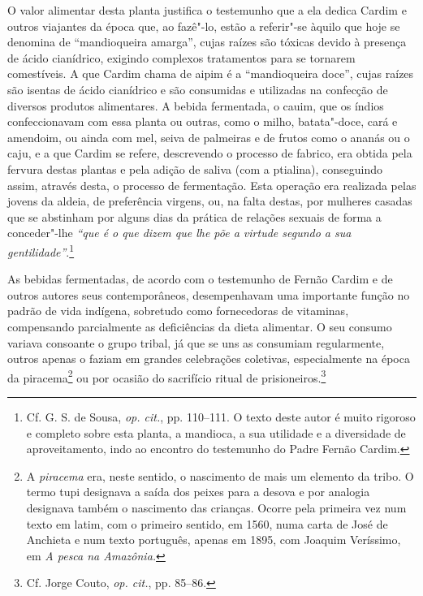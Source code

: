  O valor alimentar desta planta justifica o testemunho que a
ela dedica Cardim e outros viajantes da época que, ao fazê"-lo, estão a
referir"-se àquilo que hoje se denomina de ``mandioqueira amarga'', cujas
raízes são tóxicas devido à presença de ácido cianídrico, exigindo
complexos tratamentos para se tornarem comestíveis. A que Cardim chama
de aipim é a ``mandioqueira doce'', cujas raízes são isentas de
ácido cianídrico e são consumidas e utilizadas na confecção de diversos
produtos alimentares. A bebida fermentada, o cauim, que os
índios confeccionavam com essa planta ou outras, como o milho,
batata"-doce, cará e amendoim, ou ainda com mel, seiva de palmeiras e
de frutos como o ananás ou o caju, e a que Cardim se refere,
descrevendo o processo de fabrico, era obtida pela fervura destas
plantas e pela adição de saliva (com a ptialina), conseguindo
assim, através desta, o processo de fermentação. Esta operação era
realizada pelas jovens da aldeia, de preferência virgens, ou, na falta
destas, por mulheres casadas que se abstinham por alguns dias da
prática de relações sexuais de forma a conceder"-lhe \textit{``que
é o que dizem que lhe põe a virtude segundo a sua 
gentilidade''}.\footnote{ Cf. G. S. de Sousa, \textit{op. cit.}, pp. 110--111. O
texto deste autor é muito rigoroso e completo sobre esta planta, a
mandioca, a sua utilidade e a diversidade de aproveitamento,
indo ao encontro do testemunho do Padre Fernão Cardim.} 

 As bebidas fermentadas, de acordo com o testemunho de Fernão
Cardim e de outros autores seus contemporâneos, desempenhavam uma
importante função no padrão de vida indígena, sobretudo como
fornecedoras de vitaminas, compensando parcialmente as deficiências da
dieta alimentar. O seu consumo variava consoante o grupo tribal, já que
se uns as consumiam regularmente, outros apenas o faziam em grandes
celebrações coletivas, especialmente na época da piracema\footnote{ A \textit{piracema} 
era, neste sentido, o nascimento de mais um
elemento da tribo. O termo tupi designava a saída dos peixes para a
desova e por analogia designava também o nascimento das crianças.
Ocorre pela primeira vez num texto em latim, com o primeiro sentido, em
1560, numa carta de José de Anchieta e num texto português,
apenas em 1895, com Joaquim Veríssimo, em \textit{A pesca na
Amazônia.}} ou por ocasião do sacrifício ritual de 
prisioneiros.\footnote{ Cf. Jorge Couto, \textit{op. cit.}, pp. 85--86.}

